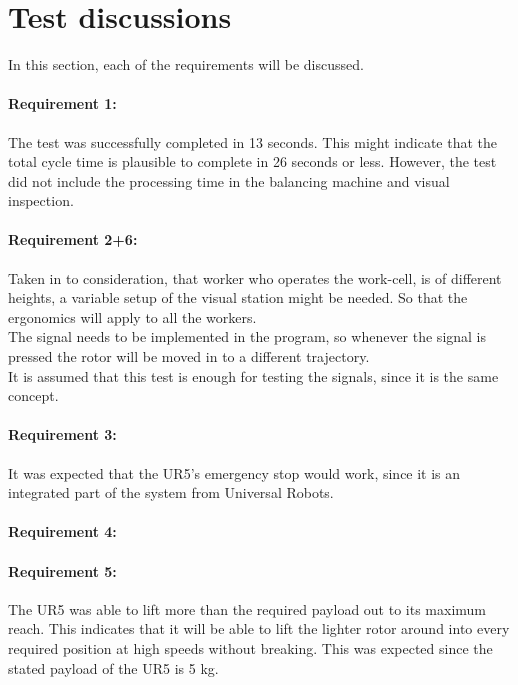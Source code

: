 \section{Test discussions}
In this section, each of the requirements will be discussed. 

\paragraph{Requirement 1:}
The test was successfully completed in 13 seconds. This might indicate that the total cycle time is plausible to complete in 26 seconds or less. However, the test did not include the processing time in the balancing machine and visual inspection. 

\paragraph{Requirement 2+6:}
Taken in to consideration, that worker who operates the work-cell, is of different heights, a variable setup of the visual station might be needed. So that the ergonomics will apply to all the workers.\\
The signal needs to be implemented in the program, so whenever the signal is pressed the rotor will be moved in to a different trajectory.\\
It is assumed that this test is enough for testing the signals, since it is the same concept.

\paragraph{Requirement 3:}
It was expected that the UR5's emergency stop would work, since it is an integrated part of the system from Universal Robots. 

\paragraph{Requirement 4:}



\paragraph{Requirement 5:}
The UR5 was able to lift more than the required payload out to its maximum reach. This indicates that it will be able to lift the lighter rotor around into every required position at high speeds without breaking. This was expected since the stated payload of the UR5 is 5 kg. 


